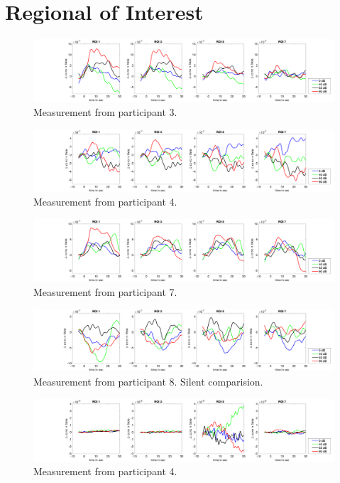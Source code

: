 \newpage

\section {Regional of Interest}

\begin{figure}[H]
  \centering
    \includegraphics[scale=.3]{bilder/ROI/sub_jonas_s_HbO.png}
  \caption{Measurement from participant  3.}
  \label{fig:somesignal}
\end{figure}

\begin{figure}[H]
  \centering
    \includegraphics[scale=.3]{bilder/ROI/sub_lukas_s_HbO.png}
  \caption{Measurement from participant 4.}
  \label{fig:somesignal}
\end{figure}


\begin{figure}[H]
  \centering
    \includegraphics[scale=.3]{bilder/ROI/sub_liao_s_HbO.png}
  \caption{Measurement from participant 7.}
  \label{fig:somesignal}
\end{figure}



\begin{figure}[H]
  \centering
    \includegraphics[scale=.3]{bilder/ROI/sub_luca2_s_HbO.png}
  \caption{Measurement from participant 8. Silent comparision.}
  \label{fig:somesignal}
\end{figure}


\begin{figure}[H]
  \centering
    \includegraphics[scale=.3]{bilder/ROI/sub_lin_s_HbO.png}
  \caption{Measurement from participant 4.}
  \label{fig:somesignal}
\end{figure}